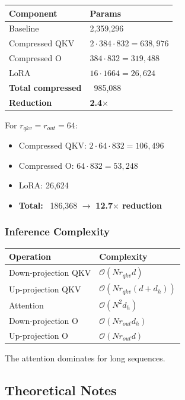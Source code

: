 \begin{table}[H]
\centering
\small
\begin{tabular}{ll}
\toprule
\textbf{Component} & \textbf{Params} \\
\midrule
Baseline & 2,359,296 \\
Compressed QKV & $2 \cdot 384 \cdot 832 = 638,976$ \\
Compressed O & $384 \cdot 832 = 319,488$ \\
LoRA & $16 \cdot 1664 = 26,624$ \\
\textbf{Total compressed} & ~985,088 \\
\textbf{Reduction} & \textbf{2.4$\times$} \\
\bottomrule
\end{tabular}
\end{table}

For $r_{qkv} = r_{out} = 64$:
\begin{itemize}
\item Compressed QKV: $2 \cdot 64 \cdot 832 = 106,496$
\item Compressed O: $64 \cdot 832 = 53,248$
\item LoRA: 26,624
\item \textbf{Total:} ~186,368 $\to$ \textbf{12.7$\times$ reduction}

\end{itemize}
\subsubsection{Inference Complexity}

\begin{table}[H]
\centering
\small
\begin{tabular}{ll}
\toprule
\textbf{Operation} & \textbf{Complexity} \\
\midrule
Down-projection QKV & $\mathcal{O}(N r_{qkv} d)$ \\
Up-projection QKV & $\mathcal{O}(N r_{qkv} (d + d_h))$ \\
Attention & $\mathcal{O}(N^2 d_h)$ \\
Down-projection O & $\mathcal{O}(N r_{out} d_h)$ \\
Up-projection O & $\mathcal{O}(N r_{out} d)$ \\
\bottomrule
\end{tabular}
\end{table}

The attention dominates for long sequences.

\subsection{Theoretical Notes}

